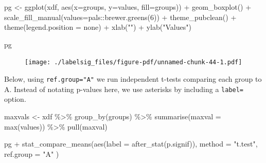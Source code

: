 \documentclass[
  letterpaper,
  DIV=11,
  numbers=noendperiod]{scrreprt}
\newenvironment{Shaded}{\begin{snugshade}}{\end{snugshade}}
\newcommand{\AttributeTok}[1]{\textcolor[rgb]{0.40,0.45,0.13}{#1}}
\newcommand{\DecValTok}[1]{\textcolor[rgb]{0.68,0.00,0.00}{#1}}
\newcommand{\FunctionTok}[1]{\textcolor[rgb]{0.28,0.35,0.67}{#1}}
\newcommand{\NormalTok}[1]{\textcolor[rgb]{0.00,0.23,0.31}{#1}}
\newcommand{\OtherTok}[1]{\textcolor[rgb]{0.00,0.23,0.31}{#1}}
\newcommand{\SpecialCharTok}[1]{\textcolor[rgb]{0.37,0.37,0.37}{#1}}
\newcommand{\StringTok}[1]{\textcolor[rgb]{0.13,0.47,0.30}{#1}}
\begin{document}
\begin{Shaded}
\begin{Highlighting}[]
\NormalTok{pg }\OtherTok{\textless{}{-}} \FunctionTok{ggplot}\NormalTok{(xdf, }\FunctionTok{aes}\NormalTok{(}\AttributeTok{x=}\NormalTok{groups, }\AttributeTok{y=}\NormalTok{values, }\AttributeTok{fill=}\NormalTok{groups)) }\SpecialCharTok{+}
  \FunctionTok{geom\_boxplot}\NormalTok{() }\SpecialCharTok{+}
  \FunctionTok{scale\_fill\_manual}\NormalTok{(}\AttributeTok{values=}\NormalTok{pals}\SpecialCharTok{::}\FunctionTok{brewer.greens}\NormalTok{(}\DecValTok{6}\NormalTok{)) }\SpecialCharTok{+}
  \FunctionTok{theme\_pubclean}\NormalTok{() }\SpecialCharTok{+}
  \FunctionTok{theme}\NormalTok{(}\AttributeTok{legend.position =} \StringTok{\textquotesingle{}none\textquotesingle{}}\NormalTok{) }\SpecialCharTok{+}
  \FunctionTok{xlab}\NormalTok{(}\StringTok{""}\NormalTok{) }\SpecialCharTok{+}
  \FunctionTok{ylab}\NormalTok{(}\StringTok{"Values"}\NormalTok{) }

\NormalTok{pg}
\end{Highlighting}
\end{Shaded}

\begin{figure}[H]

{\centering \texttt{[image: ./labelsig\_files/figure-pdf/unnamed-chunk-44-1.pdf]}

}

\end{figure}

Below, using \texttt{ref.group="A"} we run independent t-tests comparing
each group to A. Instead of notating p-values here, we use asterisks by
including a \texttt{label=} option.

\begin{Shaded}
\begin{Highlighting}[]
\NormalTok{maxvals }\OtherTok{\textless{}{-}}\NormalTok{ xdf }\SpecialCharTok{\%\textgreater{}\%} 
  \FunctionTok{group\_by}\NormalTok{(groups) }\SpecialCharTok{\%\textgreater{}\%} 
  \FunctionTok{summarise}\NormalTok{(}\AttributeTok{maxval =} \FunctionTok{max}\NormalTok{(values)) }\SpecialCharTok{\%\textgreater{}\%} 
  \FunctionTok{pull}\NormalTok{(maxval) }

\NormalTok{pg }\SpecialCharTok{+}  
  \FunctionTok{stat\_compare\_means}\NormalTok{(}\FunctionTok{aes}\NormalTok{(}\AttributeTok{label =} \FunctionTok{after\_stat}\NormalTok{(p.signif)),}
                   \AttributeTok{method =} \StringTok{"t.test"}\NormalTok{, }\AttributeTok{ref.group =} \StringTok{"A"}
\NormalTok{                   )}
\end{Highlighting}
\end{Shaded}
\end{document}
